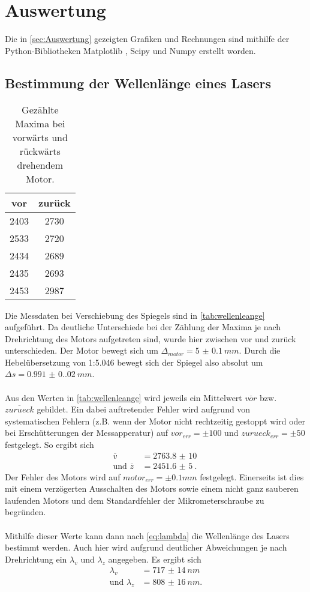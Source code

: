 \section{Auswertung}
\label{sec:Auswertung}
Die in \autoref{sec:Auswertung} gezeigten Grafiken und Rechnungen sind mithilfe der Python-Bibliotheken Matplotlib \cite{matplotlib}, Scipy \cite{scipy} und Numpy \cite{numpy}
erstellt worden.

\subsection{Bestimmung der Wellenlänge eines Lasers}
\begin{table}[H]
  \centering
  \caption{Gezählte Maxima bei vorwärts und rückwärts drehendem Motor.}
  \begin{tabular}{c c}
      \toprule
      vor & zurück\\
      \midrule
      2403 & 2730\\
      2533 & 2720\\
      2434 & 2689\\
      2435 & 2693\\
      2453 & 2987\\
      \bottomrule
  \end{tabular}
  \label{tab:wellenleange}
\end{table}
Die Messdaten bei Verschiebung des Spiegels sind in \autoref{tab:wellenleange} aufgeführt. Da deutliche Unterschiede bei der Zählung der 
Maxima je nach Drehrichtung des Motors aufgetreten sind, wurde hier zwischen vor und zurück unterschieden. Der Motor bewegt sich um 
$\Delta_{motor} = \SI{5(0.1)}{mm}$. Durch die Hebelübersetzung von 1:5.046 bewegt sich der Spiegel also absolut um $\Delta s = \SI{0.991(0.020)}{mm}$.
\\
\\
Aus den Werten in \autoref{tab:wellenleange} wird jeweils ein Mittelwert $\overline{vor}$ bzw. $\overline{zurueck}$ gebildet. Ein dabei auftretender Fehler wird aufgrund von 
systematischen Fehlern (z.B. wenn der Motor nicht rechtzeitig gestoppt wird oder bei Erschütterungen der Messapperatur) auf $vor_{err} = \pm 100$ und $zurueck_{err} = \pm 50$ festgelegt.
So ergibt sich 
\begin{align*}
  \overline{v} &= \SI{2763.8(100)}{}\\
  \text{und } \overline{z}\, &= \SI{2451.6(50)}{}.
\end{align*}
Der Fehler des Motors wird auf $motor_{err} = \pm 0.1 \unit{mm}$ festgelegt. Einerseits ist dies mit einem verzögerten Ausschalten des Motors sowie einem nicht
ganz sauberen laufenden Motors und dem Standardfehler der Mikrometerschraube zu begründen.
\\
\\
Mithilfe dieser Werte kann dann nach \autoref{eq:lambda} die Wellenlänge des Lasers bestimmt werden. Auch hier wird aufgrund deutlicher Abweichungen je nach Drehrichtung
ein $\lambda_{v}$ und $\lambda_{z}$ angegeben.
Es ergibt sich 
\begin{align*}
  \lambda_{v} &= \SI{717(14)}{nm}\\
  \text{und } \lambda_{z} &= \SI{808(16)}{nm}.
\end{align*}

